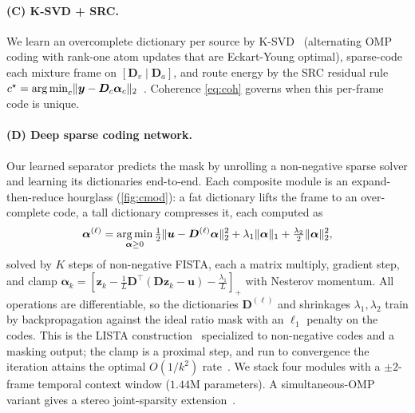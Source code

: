 \documentclass{article}
\DeclarePairedDelimiter{\norm}{\lVert}{\rVert}
\DeclareMathOperator*{\argmin}{arg\,min}
\newcommand{\D}{\bm{D}}
\newcommand{\yv}{\bm{y}}
\newcommand{\av}{\bm{\alpha}}
\begin{document}
\paragraph{(C) K-SVD + SRC.} We learn an overcomplete dictionary per source by
K-SVD~\cite{aharon2006ksvd} (alternating OMP coding with rank-one atom updates that
are Eckart-Young optimal), sparse-code each mixture frame on $[\D_v\mid\D_a]$, and
route energy by the SRC residual rule
$c^\star=\argmin_c\norm{\yv-\D_c\av_c}_2$~\cite{wright2009src}. Coherence
\cref{eq:coh} governs when this per-frame code is unique.

\paragraph{(D) Deep sparse coding network.}
Our learned separator predicts the mask by unrolling a non-negative sparse solver
and learning its dictionaries end-to-end. Each composite module is an
expand-then-reduce hourglass (\cref{fig:cmod}): a fat dictionary lifts the frame to
an over-complete code, a tall dictionary compresses it, each computed as
\begin{equation}
\av^{(\ell)}=\argmin_{\av\ge0}\tfrac12\norm{\bm u-\D^{(\ell)}\av}_2^2
+\lambda_1\norm{\av}_1+\tfrac{\lambda_2}2\norm{\av}_2^2,
\end{equation}
solved by $K$ steps of non-negative FISTA, each a matrix multiply, gradient step,
and clamp $\av_k=[\bm z_k-\tfrac1L\D^\top(\D\bm z_k-\bm u)-\tfrac{\lambda_1}L]_+$
with Nesterov momentum. All operations are differentiable, so the dictionaries
$\D^{(\ell)}$ and shrinkages $\lambda_1,\lambda_2$ train by backpropagation against
the ideal ratio mask with an $\ell_1$ penalty on the codes. This is the LISTA
construction~\cite{gregor2010lista} specialized to non-negative codes and a masking
output; the clamp is a proximal step, and run to convergence the iteration attains
the optimal $O(1/k^2)$ rate~\cite{beck2009fista}. We stack four modules with a
$\pm2$-frame temporal context window ($1.44$M parameters). A simultaneous-OMP
variant gives a stereo joint-sparsity extension~\cite{tropp2006somp}.
\end{document}
